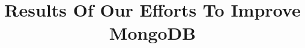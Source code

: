 \documentclass{../dependencies/acm_proc_article-sp}
\begin{document}
\title{ Results Of Our Efforts To Improve MongoDB }
%
%
%
%
%
\end{document}
